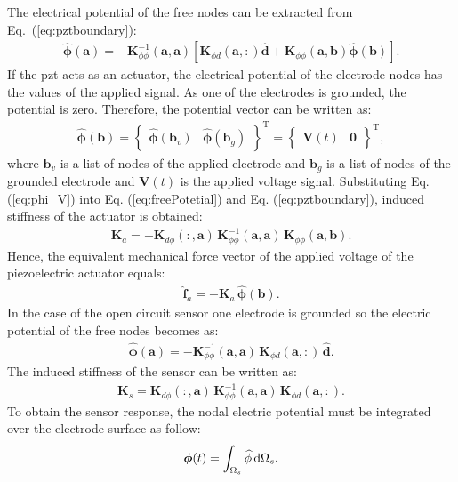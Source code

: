 The electrical potential of the free nodes can be extracted from Eq.~(\ref{eq:pztboundary}):
\begin{eqnarray}
	\widehat{\boldsymbol{\phi}}(\textbf{a}) = -\textbf{K}_{\phi\phi}^{-1}(\textbf{a},\textbf{a})\left[\textbf{K}_{\phi d}(\textbf{a},:) \widehat{\textbf{d}} + \textbf{K}_{\phi\phi}(\textbf{a},\textbf{b})\widehat{\boldsymbol{\phi}}(\textbf{b}) \right].
	\label{eq:freePotetial}
\end{eqnarray}
If the \ac{pzt} acts as an actuator, the electrical potential of the electrode nodes has the values of the applied signal.
As one of the electrodes is grounded, the potential is zero.
Therefore, the potential vector can be written as:
\begin{eqnarray}
	\widehat{\boldsymbol{\phi}}(\textbf{b}) = \left \{\begin{array}{cc}
		\widehat{\boldsymbol{\phi}}(\textbf{b}_v) &
		\widehat{\boldsymbol{\phi}}(\textbf{b}_g)
	\end{array}\right \}^{\mathrm{T}}=\left \{\begin{array}{cc}
	\textbf{V}(t) & \textbf{0}
	\end{array}\right \}^{\mathrm{T}},
	\label{eq:phi_V}
\end{eqnarray}
where \(\textbf{b}_v\) is a list of nodes of the applied electrode and \(\textbf{b}_g\) is a list of nodes of the grounded electrode and \(\textbf{V}(t)\) is the applied voltage signal.
Substituting Eq. (\ref{eq:phi_V}) into Eq. (\ref{eq:freePotetial}) and Eq. (\ref{eq:pztboundary}), induced stiffness of the actuator is obtained:
\begin{eqnarray}
	\textbf{K}_{a}=-\textbf{K}_{d\phi}(:,\textbf{a})\,\textbf{K}_{\phi \phi}^{-1}(\textbf{a},\textbf{a})\,\textbf{K}_{\phi \phi} (\textbf{a},\textbf{b}).
\end{eqnarray}
Hence, the equivalent mechanical force vector of the applied voltage of the piezoelectric actuator equals:
\begin{eqnarray}
	\widehat{\textbf{f}}_{a}=-\textbf{K}_{a}\,\widehat{\boldsymbol{\phi}}(\textbf{b}).
	\label{eq:f_act}
\end{eqnarray}
%
In the case of the open circuit sensor one electrode is grounded so the electric potential of the free nodes becomes as:
\begin{eqnarray}
	\widehat{\boldsymbol{\phi}}(\textbf{a}) = -\textbf{K}_{\phi\phi}^{-1}(\textbf{a},\textbf{a})\,\textbf{K}_{\phi d}(\textbf{a},:)\,\widehat{\textbf{d}}.
	\label{eq:sensorPotetial}
\end{eqnarray}
The induced stiffness of the sensor can be written as:
\begin{eqnarray} \textbf{K}_s=\textbf{K}_{d \phi}(:,\textbf{a})\,\textbf{K}_{\phi \phi}^{-1} (\textbf{a},\textbf{a})\,\textbf{K}_{\phi d}(\textbf{a},:).
\end{eqnarray}
To obtain the sensor response, the nodal electric potential must be integrated over the electrode surface as follow:
\begin{eqnarray}
	\boldsymbol{\phi}(t) = \int_{\Omega_s}\widehat{\phi} \mathop{}\!\mathrm{d}\Omega_s.
	\label{eq:sensorResponse}
\end{eqnarray}